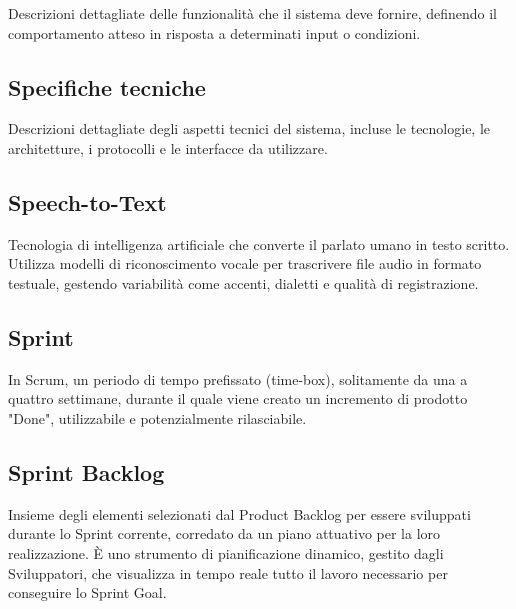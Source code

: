 \documentclass[a4paper, 11pt, oneside]{scrartcl} %
\begin{document}
Descrizioni dettagliate delle funzionalità che il sistema deve fornire, definendo il comportamento atteso in risposta a determinati input o condizioni.

\vspace{0.5cm}

\subsection*{Specifiche tecniche}


Descrizioni dettagliate degli aspetti tecnici del sistema, incluse le tecnologie, le architetture, i protocolli e le interfacce da utilizzare.

\vspace{0.5cm}

\subsection*{Speech-to-Text}
Tecnologia di intelligenza artificiale che converte il parlato umano in testo scritto. Utilizza modelli di riconoscimento vocale per trascrivere file audio in formato testuale, gestendo variabilità come accenti, dialetti e qualità di registrazione.
\vspace{0.5cm}

\subsection*{Sprint}
In Scrum, un periodo di tempo prefissato (time-box), solitamente da una a quattro settimane, durante il quale viene creato un incremento di prodotto "Done", utilizzabile e potenzialmente rilasciabile.
\vspace{0.5cm}

\subsection*{Sprint Backlog}
Insieme degli elementi selezionati dal Product Backlog per essere sviluppati durante lo Sprint corrente, corredato da un piano attuativo per la loro realizzazione. È uno strumento di pianificazione dinamico, gestito dagli Sviluppatori, che visualizza in tempo reale tutto il lavoro necessario per conseguire lo Sprint Goal.
\vspace{0.5cm}
\end{document}
